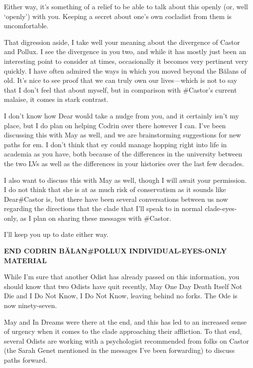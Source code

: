 Either way, it's something of a relief to be able to talk about this openly (or, well `openly') with you. Keeping a secret about one's own cocladist from them is uncomfortable.

That digression aside, I take well your meaning about the divergence of Castor and Pollux. I see the divergence in you two, and while it has mostly just been an interesting point to consider at times, occasionally it becomes very pertinent very quickly. I have often admired the ways in which you moved beyond the Bălans of old. It's nice to see proof that we can truly own our lives—which is not to say that I don't feel that about myself, but in comparison with \#Castor's current malaise, it comes in stark contrast.

I don't know how Dear would take a nudge from you, and it certainly isn't my place, but I do plan on helping Codrin over there however I can. I've been discussing this with May as well, and we are brainstorming suggestions for new paths for em. I don't think that ey could manage hopping right into life in academia as you have, both because of the differences in the university between the two LVs as well as the differences in your histories over the last few decades.

I also want to discuss this with May as well, though I will await your permission. I do not think that she is at as much risk of conservatism as it sounds like Dear\#Castor is, but there have been several conversations between us now regarding the directions that the clade that I'll speak to in normal clade-eyes-only, as I plan on sharing these messages with \#Castor.

I'll keep you up to date either way.

\begin{center}
\textbf{END CODRIN BĂLAN\#POLLUX INDIVIDUAL-EYES-ONLY MATERIAL}
\end{center}

\noindent While I'm sure that another Odist has already passed on this information, you should know that two Odists have quit recently, May One Day Death Itself Not Die and I Do Not Know, I Do Not Know, leaving behind no forks. The Ode is now ninety-seven.

May and In Dreams were there at the end, and this has led to an increased sense of urgency when it comes to the clade approaching their affliction. To that end, several Odists are working with a psychologist recommended from folks on Castor (the Sarah Genet mentioned in the messages I've been forwarding) to discuss paths forward.

